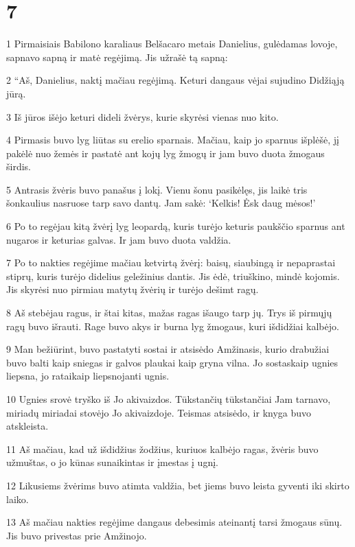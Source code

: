 \chapter{7}


\par 1 Pirmaisiais Babilono karaliaus Belšacaro metais Danielius, gulėdamas lovoje, sapnavo sapną ir matė regėjimą. Jis užrašė tą sapną: 
\par 2 “Aš, Danielius, naktį mačiau regėjimą. Keturi dangaus vėjai sujudino Didžiąją jūrą. 
\par 3 Iš jūros išėjo keturi dideli žvėrys, kurie skyrėsi vienas nuo kito. 
\par 4 Pirmasis buvo lyg liūtas su erelio sparnais. Mačiau, kaip jo sparnus išplėšė, jį pakėlė nuo žemės ir pastatė ant kojų lyg žmogų ir jam buvo duota žmogaus širdis. 
\par 5 Antrasis žvėris buvo panašus į lokį. Vienu šonu pasikėlęs, jis laikė tris šonkaulius nasruose tarp savo dantų. Jam sakė: ‘Kelkis! Ėsk daug mėsos!’ 
\par 6 Po to regėjau kitą žvėrį lyg leopardą, kuris turėjo keturis paukščio sparnus ant nugaros ir keturias galvas. Ir jam buvo duota valdžia. 
\par 7 Po to nakties regėjime mačiau ketvirtą žvėrį: baisų, siaubingą ir nepaprastai stiprų, kuris turėjo didelius geležinius dantis. Jis ėdė, triuškino, mindė kojomis. Jis skyrėsi nuo pirmiau matytų žvėrių ir turėjo dešimt ragų. 
\par 8 Aš stebėjau ragus, ir štai kitas, mažas ragas išaugo tarp jų. Trys iš pirmųjų ragų buvo išrauti. Rage buvo akys ir burna lyg žmogaus, kuri išdidžiai kalbėjo. 
\par 9 Man bežiūrint, buvo pastatyti sostai ir atsisėdo Amžinasis, kurio drabužiai buvo balti kaip sniegas ir galvos plaukai kaip gryna vilna. Jo sostas­kaip ugnies liepsna, jo ratai­kaip liepsnojanti ugnis. 
\par 10 Ugnies srovė tryško iš Jo akivaizdos. Tūkstančių tūkstančiai Jam tarnavo, miriadų miriadai stovėjo Jo akivaizdoje. Teismas atsisėdo, ir knyga buvo atskleista. 
\par 11 Aš mačiau, kad už išdidžius žodžius, kuriuos kalbėjo ragas, žvėris buvo užmuštas, o jo kūnas sunaikintas ir įmestas į ugnį. 
\par 12 Likusiems žvėrims buvo atimta valdžia, bet jiems buvo leista gyventi iki skirto laiko. 
\par 13 Aš mačiau nakties regėjime dangaus debesimis ateinantį tarsi žmogaus sūnų. Jis buvo privestas prie Amžinojo. 
